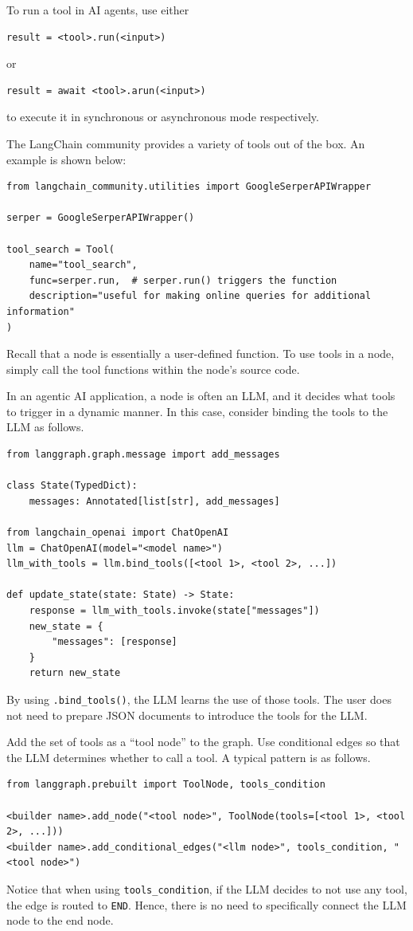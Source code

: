 To run a tool in AI agents, use either
\begin{lstlisting}
result = <tool>.run(<input>)
\end{lstlisting}
or
\begin{lstlisting}
result = await <tool>.arun(<input>)
\end{lstlisting}
to execute it in synchronous or asynchronous mode respectively.

The LangChain community provides a variety of tools out of the box. An example is shown below:
\begin{lstlisting}
from langchain_community.utilities import GoogleSerperAPIWrapper

serper = GoogleSerperAPIWrapper()

tool_search = Tool(
    name="tool_search",
    func=serper.run,  # serper.run() triggers the function
    description="useful for making online queries for additional information"
)
\end{lstlisting}

Recall that a node is essentially a user-defined function. To use tools in a node, simply call the tool functions within the node’s source code.

In an agentic AI application, a node is often an LLM, and it decides what tools to trigger in a dynamic manner. In this case, consider binding the tools to the LLM as follows.
\begin{lstlisting}
from langgraph.graph.message import add_messages

class State(TypedDict):
    messages: Annotated[list[str], add_messages]
    
from langchain_openai import ChatOpenAI
llm = ChatOpenAI(model="<model name>")
llm_with_tools = llm.bind_tools([<tool 1>, <tool 2>, ...])

def update_state(state: State) -> State:
    response = llm_with_tools.invoke(state["messages"])
    new_state = {
        "messages": [response]
    }
    return new_state
\end{lstlisting}
By using \verb|.bind_tools()|, the LLM learns the use of those tools. The user does not need to prepare JSON documents to introduce the tools for the LLM.

Add the set of tools as a ``tool node'' to the graph. Use conditional edges so that the LLM determines whether to call a tool. A typical pattern is as follows.
\begin{lstlisting}
from langgraph.prebuilt import ToolNode, tools_condition

<builder name>.add_node("<tool node>", ToolNode(tools=[<tool 1>, <tool 2>, ...]))
<builder name>.add_conditional_edges("<llm node>", tools_condition, "<tool node>")
\end{lstlisting}
Notice that when using \verb|tools_condition|, if the LLM decides to not use any tool, the edge is routed to \verb|END|. Hence, there is no need to specifically connect the LLM node to the end node.

